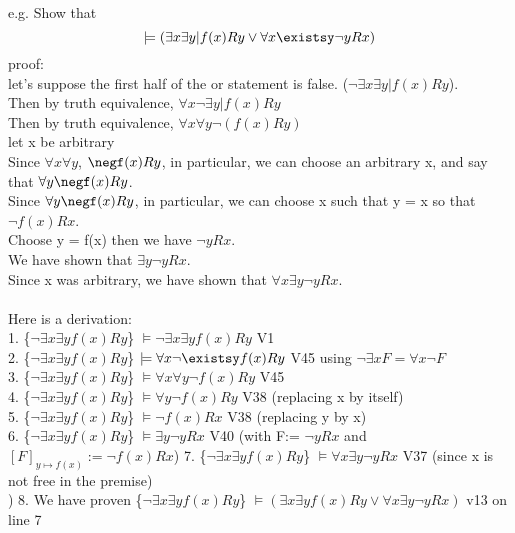 \documentclass[10pt,letter]{article}
\begin{document}
e.g. Show that $$\models (\exists x \exists y | f(x)Ry \vee \forall x \existsy \neg yRx)$$
proof:\\
let's suppose the first half of the or statement is false. ($\neg \exists x \exists y | f(x)Ry$).\\ 
Then by truth equivalence, $\forall x \neg\exists y | f(x)Ry$\\
Then by truth equivalence, $\forall x \forall y \neg(f(x)Ry)$\\
let x be arbitrary\\
Since $\forall x \forall y$, $\negf(x)Ry$, in particular, we can choose an arbitrary x, and say that $\forall y \negf(x)Ry$.\\
Since $\forall y \negf(x)Ry$, in particular, we can choose x such that y = x so that $\neg f(x)Rx$.\\ 
Choose y = f(x) then we have $\neg yRx$. \\
We have shown that $\exists y \neg yRx$. \\
Since x was arbitrary, we have shown that $\forall x \exists y \neg yRx$.\\\\
Here is a derivation:\\ 
1. \{$\neg\exists x \exists y f(x)Ry$\} $\models \neg\exists x \exists y f(x)Ry$ \hfill V1\\
2. \{$\neg\exists x \exists y f(x)Ry$\} $\models \forall x \neg\existsy f(x)Ry$ \hfill V45 using $\neg\exists xF = \forall x\neg F$\\
3. \{$\neg\exists x \exists y f(x)Ry$\} $\models \forall x \forall y \neg f(x)Ry$ \hfill V45\\
4. \{$\neg\exists x \exists y f(x)Ry$\} $\models \forall y \neg f(x)Ry$ \hfill V38 (replacing x by itself)\\
5. \{$\neg\exists x \exists y f(x)Ry$\} $\models \neg f(x)Rx$ \hfill V38 (replacing y by x) \\
6. \{$\neg\exists x \exists y f(x)Ry$\} $\models \exists y \neg yRx$ \hfill V40 (with F:= $\neg yRx$ and $[F]_{y\mapsto f(x)}:= \neg f(x)Rx$)  
7. \{$\neg\exists x \exists y f(x)Ry$\} $\models \forall x\exists y \neg yRx$ \hfill V37 (since x is not free in the premise)\\)
8. We have proven \{$\neg\exists x \exists y f(x)Ry$\} $\models (\exists x\exists y f(x)Ry \vee \forall x\exists y \neg yRx)$ \hfill v13 on line 7\\
\end{document}
